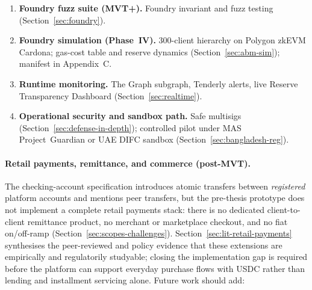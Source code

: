 \documentclass[12pt,a4paper]{report}
\begin{document}
\begin{enumerate}[noitemsep]
\item \textbf{Foundry fuzz suite (MVT+).} Foundry invariant and fuzz testing (Section~\ref{sec:foundry}).
\item \textbf{Foundry simulation (Phase~IV).} 300-client hierarchy on Polygon zkEVM Cardona; gas-cost table and reserve dynamics (Section~\ref{sec:abm-sim}); manifest in Appendix~C.
\item \textbf{Runtime monitoring.} The Graph subgraph, Tenderly alerts, live Reserve Transparency Dashboard (Section~\ref{sec:realtime}).
\item \textbf{Operational security and sandbox path.} Safe multisigs (Section~\ref{sec:defense-in-depth}); controlled pilot under MAS Project~Guardian or UAE DIFC sandbox (Section~\ref{sec:bangladesh-reg}).
\end{enumerate}

\paragraph{Retail payments, remittance, and commerce (post-MVT).}
\label{sec:future-retail-payments}

The checking-account specification introduces atomic transfers between \emph{registered} platform accounts and mentions peer transfers, but the pre-thesis prototype does not implement a complete retail payments stack: there is no dedicated client-to-client remittance product, no merchant or marketplace checkout, and no fiat on/off-ramp (Section~\ref{sec:scopes-challenges}). Section~\ref{sec:lit-retail-payments} synthesises the peer-reviewed and policy evidence that these extensions are empirically and regulatorily studyable; closing the implementation gap is required before the platform can support everyday purchase flows with USDC rather than lending and installment servicing alone. Future work should add:
\end{document}
